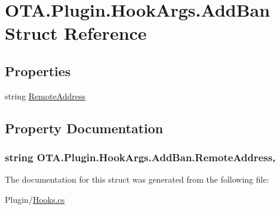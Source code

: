 \hypertarget{struct_o_t_a_1_1_plugin_1_1_hook_args_1_1_add_ban}{}\section{O\+T\+A.\+Plugin.\+Hook\+Args.\+Add\+Ban Struct Reference}
\label{struct_o_t_a_1_1_plugin_1_1_hook_args_1_1_add_ban}
\subsection*{Properties}
\begin{DoxyCompactItemize}
\item 
string \hyperlink{struct_o_t_a_1_1_plugin_1_1_hook_args_1_1_add_ban_a6bd35de3b30de19a2d9c72d9dd81a29d}{Remote\+Address}
\end{DoxyCompactItemize}


\subsection{Property Documentation}
\hypertarget{struct_o_t_a_1_1_plugin_1_1_hook_args_1_1_add_ban_a6bd35de3b30de19a2d9c72d9dd81a29d}{}
\subsubsection[{Remote\+Address}]{\setlength{\rightskip}{0pt plus 5cm}string O\+T\+A.\+Plugin.\+Hook\+Args.\+Add\+Ban.\+Remote\+Address\hspace{0.3cm}{\ttfamily [get]}, {\ttfamily [set]}}\label{struct_o_t_a_1_1_plugin_1_1_hook_args_1_1_add_ban_a6bd35de3b30de19a2d9c72d9dd81a29d}


The documentation for this struct was generated from the following file\+:\begin{DoxyCompactItemize}
\item 
Plugin/\hyperlink{_hooks_8cs}{Hooks.\+cs}\end{DoxyCompactItemize}
